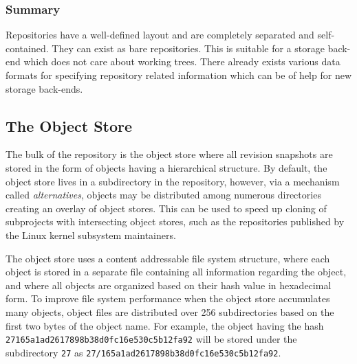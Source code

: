 \begin{comment}

\subsubsection{The Index File}

Staging area during merges

A cache of file system (fstat()) info

	-> a fast method for checking for modifications

Allows certain operations to be performed directly in the index (file)
instead of the working tree.

This was solved by introducing a directory cache
in the form of an index file listing all files tracked by the VCS
together with file system status information, that allows to quickly
determine whether a file has changed on disk.

\end{comment}

\subsubsection*{Summary}

Repositories have a well-defined layout and are completely separated
and self-contained. They can exist as bare repositories. This is
suitable for a storage back-end which does not care about working
trees. There already exists various data formats for specifying
repository related information which can be of help for new storage
back-ends.

\subsection{The Object Store} \label{sec:object-store}

The bulk of the repository is the object store where all revision
snapshots are stored in the form of objects having a hierarchical
structure. By default, the object store lives in a subdirectory in the
repository, however, via a mechanism called \emph{alternatives},
objects may be distributed among numerous directories creating an
overlay of object stores. This can be used to speed up cloning of
subprojects with intersecting object stores, such as the repositories
published by the Linux kernel subsystem maintainers.

The object store uses a content addressable file system structure,
where each object is stored in a separate file containing all
information regarding the object, and where all objects are organized
based on their hash value in hexadecimal form. To improve file system
performance when the object store accumulates many objects, object
files are distributed over 256 subdirectories based on the first two
bytes of the object name. For example, the object having the hash
\texttt{27165a1ad2617898b38d0fc16e530c5b12fa92} will be stored
under the subdirectory \texttt{27} as
\texttt{27/165a1ad2617898b38d0fc16e530c5b12fa92}.


